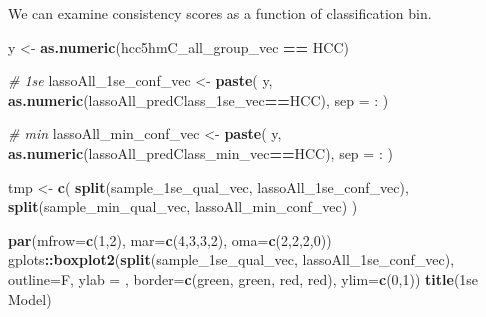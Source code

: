 \documentclass[
]{book}
\newenvironment{Shaded}{\begin{snugshade}}{\end{snugshade}}
\newcommand{\CommentTok}[1]{\textcolor[rgb]{0.56,0.35,0.01}{\textit{#1}}}
\newcommand{\DataTypeTok}[1]{\textcolor[rgb]{0.13,0.29,0.53}{#1}}
\newcommand{\DecValTok}[1]{\textcolor[rgb]{0.00,0.00,0.81}{#1}}
\newcommand{\KeywordTok}[1]{\textcolor[rgb]{0.13,0.29,0.53}{\textbf{#1}}}
\newcommand{\NormalTok}[1]{#1}
\newcommand{\OperatorTok}[1]{\textcolor[rgb]{0.81,0.36,0.00}{\textbf{#1}}}
\newcommand{\StringTok}[1]{\textcolor[rgb]{0.31,0.60,0.02}{#1}}
\begin{document}
We can examine consistency scores as a function of classification bin.

\begin{Shaded}
\begin{Highlighting}[]
\NormalTok{y <{-}}\StringTok{ }\KeywordTok{as.numeric}\NormalTok{(hcc5hmC\_all\_group\_vec }\OperatorTok{==}\StringTok{ \textquotesingle{}HCC\textquotesingle{}}\NormalTok{)}

\CommentTok{\# 1se}
\NormalTok{lassoAll\_1se\_conf\_vec <{-}}\StringTok{ }\KeywordTok{paste}\NormalTok{(}
\NormalTok{ y, }
 \KeywordTok{as.numeric}\NormalTok{(lassoAll\_predClass\_1se\_vec}\OperatorTok{==}\StringTok{\textquotesingle{}HCC\textquotesingle{}}\NormalTok{),}
 \DataTypeTok{sep =} \StringTok{\textquotesingle{}:\textquotesingle{}}
\NormalTok{)}

\CommentTok{\# min}
\NormalTok{lassoAll\_min\_conf\_vec <{-}}\StringTok{ }\KeywordTok{paste}\NormalTok{(}
\NormalTok{ y, }
 \KeywordTok{as.numeric}\NormalTok{(lassoAll\_predClass\_min\_vec}\OperatorTok{==}\StringTok{\textquotesingle{}HCC\textquotesingle{}}\NormalTok{),}
 \DataTypeTok{sep =} \StringTok{\textquotesingle{}:\textquotesingle{}}
\NormalTok{)}


\NormalTok{tmp <{-}}\StringTok{ }\KeywordTok{c}\NormalTok{(}
 \KeywordTok{split}\NormalTok{(sample\_1se\_qual\_vec, lassoAll\_1se\_conf\_vec), }
 \KeywordTok{split}\NormalTok{(sample\_min\_qual\_vec, lassoAll\_min\_conf\_vec)}
\NormalTok{)}

\KeywordTok{par}\NormalTok{(}\DataTypeTok{mfrow=}\KeywordTok{c}\NormalTok{(}\DecValTok{1}\NormalTok{,}\DecValTok{2}\NormalTok{), }\DataTypeTok{mar=}\KeywordTok{c}\NormalTok{(}\DecValTok{4}\NormalTok{,}\DecValTok{3}\NormalTok{,}\DecValTok{3}\NormalTok{,}\DecValTok{2}\NormalTok{), }\DataTypeTok{oma=}\KeywordTok{c}\NormalTok{(}\DecValTok{2}\NormalTok{,}\DecValTok{2}\NormalTok{,}\DecValTok{2}\NormalTok{,}\DecValTok{0}\NormalTok{))}
\NormalTok{gplots}\OperatorTok{::}\KeywordTok{boxplot2}\NormalTok{(}\KeywordTok{split}\NormalTok{(sample\_1se\_qual\_vec, lassoAll\_1se\_conf\_vec), }
  \DataTypeTok{outline=}\NormalTok{F, }\DataTypeTok{ylab =} \StringTok{\textquotesingle{}\textquotesingle{}}\NormalTok{, }
  \DataTypeTok{border=}\KeywordTok{c}\NormalTok{(}\StringTok{\textquotesingle{}green\textquotesingle{}}\NormalTok{, }\StringTok{\textquotesingle{}green\textquotesingle{}}\NormalTok{, }\StringTok{\textquotesingle{}red\textquotesingle{}}\NormalTok{, }\StringTok{\textquotesingle{}red\textquotesingle{}}\NormalTok{),}
  \DataTypeTok{ylim=}\KeywordTok{c}\NormalTok{(}\DecValTok{0}\NormalTok{,}\DecValTok{1}\NormalTok{))}
\KeywordTok{title}\NormalTok{(}\StringTok{\textquotesingle{}1se Model\textquotesingle{}}\NormalTok{)}


\end{Highlighting}
\end{Shaded}
\end{document}
